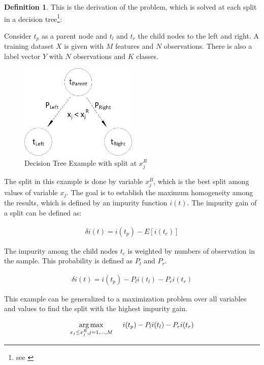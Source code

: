 \documentclass[12pt, a4paper]{scrartcl}
\theoremstyle{definition}
\newtheorem{definition}{Definition}[subsection]
\begin{document}
\begin{definition}
This is the derivation of the problem, which is solved at each split in a
decision tree\footnote{see \citet{breiman1984classification}}:

Consider $t_p$ as a parent node and $t_l$ and $t_r$ the child nodes to the left
and right. A training dataset $X$ is given with $M$ features and $N$
observations. There is also a label vector $Y$ with $N$ observations and $K$
classes.

\begin{figure}[!ht]
	\centering
	\includegraphics[width=0.5\textwidth]{graphics/giniimpurity.png}
	\caption{Decision Tree Example with split at $x^R_j$}
	\label{fig:giniimpurity}
\end{figure}

The split in this example is done by variable $x^B_j$, which is the best split
among values of variable $x_j$. The goal is to establish the maximum
homogeneity among the results, which is defined by an impurity function $i(t)$.
The impurity gain of a split can be defined as:

\begin{align*}
\delta i(t) = i(t_p) - E[i(t_c)]
\end{align*}

The impurity among the child nodes $t_c$ is weighted by numbers of observation
in the sample. This probability is defined as $P_l$ and $P_r$.

\begin{align*}
\delta i(t) = i(t_p) - P_li(t_l) - P_ri(t_r)
\end{align*}

This example can be generalized to a maximization problem over all variables
and values to find the split with the highest impurity gain.

\begin{align*}
\underset{x_j\leq x^R_j,j=1,\dots,M}{\arg\max}\hspace{5mm} i(t_p) - P_li(t_l) -P_ri(t_r)
\end{align*}


\end{definition}
\end{document}
